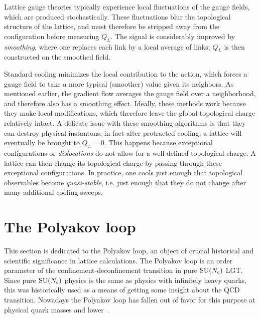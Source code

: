 Lattice gauge theories typically experience
local fluctuations of the gauge fields, which are produced stochastically. 
These fluctuations blur the topological structure of the lattice, and 
must therefore be stripped away from the configuration before measuring 
$Q_L$. The signal is considerably improved by 
{\it smoothing}, where one replaces each link by a local average of links; 
$Q_L$ is then constructed on the smoothed field. 

Standard cooling minimizes the local contribution
to the action, which forces a gauge field to take a more typical
(smoother) value given its neighbors.
As mentioned earlier, the gradient flow averages the gauge field over 
a neighborhood, and therefore also has a smoothing effect. 
Ideally, these methods work because they make local modifications,
which therefore leave the global topological charge relatively intact.
A delicate issue with these smoothing algorithms is that they can destroy 
physical instantons; in fact after protracted cooling, a lattice will
eventually be brought to $Q_L=0$. This happens because
exceptional configurations or 
{\it dislocations} do not allow
for a well-defined topological charge. A lattice can then change
its topological charge by passing through these exceptional configurations.
In practice, one cools just enough
that topological observables become {\it quasi-stable}, i.e. just
enough that they do not change after many additional cooling sweeps.

\section{The Polyakov loop}\label{sec:ploop}

This section is dedicated to the Polyakov loop, an object of crucial
historical and scientific significance in lattice calculations. The
Polyakov loop is an order parameter of the confinement-deconfinement
transition in pure $\operatorname{SU}(N_c)$ LGT. Since pure $\operatorname{SU}(N_c)$ physics is the 
same as physics with infinitely heavy quarks, this was historically used
as a means of getting some insight about the QCD transition. Nowadays
the Polyakov loop has fallen out of favor for this purpose at physical
quark masses and lower~\cite{clarke_polyakov_2020}.

